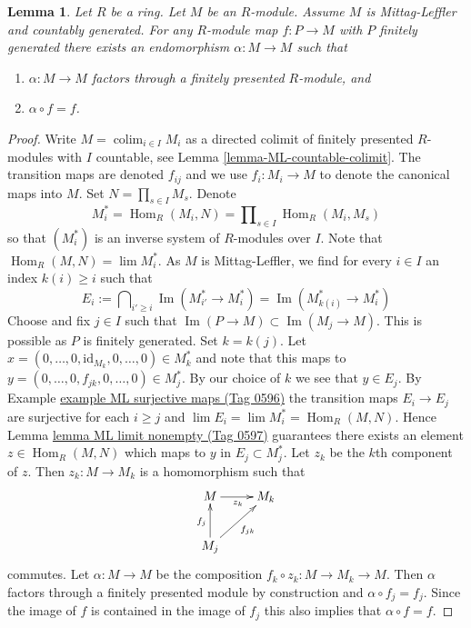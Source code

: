 \documentclass{amsart}
\theoremstyle{plain}
\newtheorem{lemma}[subsection]{Lemma}
\theoremstyle{definition}
\theoremstyle{remark}
\numberwithin{equation}{subsection}
\def\lim{\mathop{\mathrm{lim}}\nolimits}
\def\colim{\mathop{\mathrm{colim}}\nolimits}
\def\Hom{\mathop{\mathrm{Hom}}\nolimits}
\def\Im{\mathop{\mathrm{Im}}}
\begin{document}
\begin{lemma}
\label{lemma-ML-countable}
Let $R$ be a ring.
Let $M$ be an $R$-module.
Assume $M$ is Mittag-Leffler and countably generated.
For any $R$-module map $f : P \to M$ with $P$ finitely generated there
exists an endomorphism $\alpha : M \to M$ such that
\begin{enumerate}
\item $\alpha : M \to M$ factors through a finitely presented $R$-module, and
\item $\alpha \circ f = f$.
\end{enumerate}
\end{lemma}

\begin{proof}
Write $M = \colim_{i \in I} M_i$ as a directed colimit of finitely
presented $R$-modules with $I$ countable, see
Lemma \ref{lemma-ML-countable-colimit}.
The transition maps are denoted $f_{ij}$ and we use $f_i : M_i \to M$
to denote the canonical maps into $M$. Set $N = \prod_{s \in I} M_s$. Denote
$$
M_i^* = \Hom_R(M_i, N) = \prod\nolimits_{s \in I} \Hom_R(M_i, M_s)
$$
so that $(M_i^*)$ is an inverse system of $R$-modules over $I$.
Note that $\Hom_R(M, N) = \lim M_i^*$.
As $M$ is Mittag-Leffler, we find for every
$i \in I$ an index $k(i) \geq i$ such that
$$
E_i := \bigcap\nolimits_{i' \geq i} \Im(M_{i'}^* \to M_i^*)
=
\Im(M_{k(i)}^* \to M_i^*)
$$
Choose and fix $j \in I$ such that $\Im(P \to M) \subset \Im(M_j \to M)$.
This is possible as $P$ is finitely generated. Set $k = k(j)$.
Let
$x = (0, \ldots, 0, \text{id}_{M_k}, 0, \ldots, 0) \in M_k^*$ and
note that this maps to $y = (0, \ldots, 0, f_{jk}, 0, \ldots, 0) \in M_j^*$.
By our choice of $k$ we see that $y \in E_j$. By
Example \href{https://stacks.math.columbia.edu/tag/0596}{example ML surjective maps (Tag 0596)}
the transition maps $E_i \to E_j$ are surjective for each $i \geq j$
and $\lim E_i = \lim M_i^* = \Hom_R(M, N)$. Hence
Lemma \href{https://stacks.math.columbia.edu/tag/0597}{lemma ML limit nonempty (Tag 0597)}
guarantees there exists an element $z \in \Hom_R(M, N)$
which maps to $y$ in $E_j \subset M_j^*$. Let $z_k$ be the $k$th component
of $z$. Then $z_k : M \to M_k$ is a homomorphism such that
$$
\xymatrix{
M \ar[r]_{z_k} & M_k \\
M_j \ar[ru]_{f_{jk}} \ar[u]^{f_j}
}
$$
commutes. Let $\alpha : M \to M$ be the composition
$f_k \circ z_k : M \to M_k \to M$.
Then $\alpha$ factors through a finitely presented module by construction and
$\alpha \circ f_j = f_j$. Since the image of $f$ is contained in the image of
$f_j$ this also implies that $\alpha \circ f = f$.
\end{proof}
\end{document}
